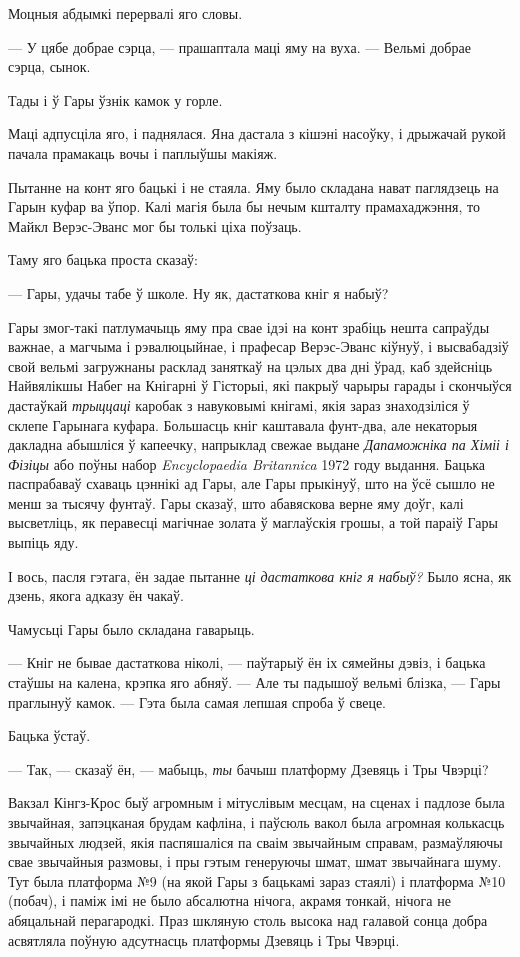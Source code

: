 Моцныя абдымкі перервалі яго словы.

--- У цябе добрае сэрца, --- прашаптала маці яму на вуха. --- Вельмі добрае 
сэрца, сынок.

Тады і ў Гары ўзнік камок у горле.

Маці адпусціла яго, і паднялася. Яна дастала з кішэні насоўку, і 
дрыжачай рукой пачала прамакаць вочы і паплыўшы макіяж.

Пытанне на конт яго бацькі і не стаяла. Яму было складана нават паглядзець
на Гарын куфар ва ўпор. Калі магія была бы нечым кшталту прамахаджэння, то
Майкл Верэс-Эванс мог бы толькі ціха поўзаць.

Таму яго бацька проста сказаў:

--- Гары, удачы табе ў школе. Ну як, дастаткова кніг я набыў?

Гары змог-такі патлумачыць яму пра свае ідэі на конт зрабіць нешта сапраўды 
важнае, а магчыма і рэвалюцыйнае, і прафесар Верэс-Эванс кіўнуў, і высвабадзіў
свой вельмі загружнаны расклад заняткаў на цэлых два дні ўрад, каб здейсніць 
Найвялікшы Набег на Кнігарні ў Гісторыі, які пакрыў чарыры гарады і скончыўся
дастаўкай  \emph{трыццаці} каробак з навуковымі кнігамі, якія зараз знаходзіліся 
ў склепе Гарынага куфара. Большасць кніг каштавала фунт-два, але некаторыя 
дакладна абышліся ў капеечку, напрыклад свежае выдане  
\emph{Дапаможніка па Хіміі і Фізіцы} або поўны набор \emph{Encyclopaedia Britannica}
1972 году выдання. Бацька паспрабаваў схаваць цэннікі ад Гары, але Гары 
прыкінуў, што на ўсё сышло не менш за тысячу фунтаў. Гары сказаў, што 
абавяскова верне яму доўг, калі высветліць, як перавесці магічнае золата ў 
маглаўскія грошы, а той параіў Гары выпіць яду.  

І вось, пасля гэтага, ён задае пытанне \emph{ці дастаткова кніг я набыў?} 
Было ясна, як дзень, якога адказу ён чакаў.

Чамусьці Гары было складана гаварыць.

--- Кніг не бывае дастаткова ніколі, --- паўтарыў ён іх сямейны дэвіз, і бацька
стаўшы на калена, крэпка яго абняў. --- Але ты падышоў вельмі блізка, 
--- Гары праглынуў камок. --- Гэта была самая лепшая спроба ў свеце.

Бацька ўстаў.

--- Так, --- сказаў ён, --- мабыць, \emph{ты} бачыш платформу Дзевяць і Тры Чвэрці?

Вакзал Кінгз-Крос быў агромным і мітуслівым месцам, на сценах і падлозе была
звычайная, запэцканая брудам кафліна, і паўсюль вакол была агромная колькасць
звычайных людзей, якія паспяшаліся па сваім звычайным справам, размаўляючы
свае звычайныя размовы, і пры гэтым генеруючы шмат, шмат звычайнага шуму.
Тут была платформа №9 (на якой Гары з бацькамі зараз стаялі) і платформа
№10 (побач), і паміж імі не было абсалютна нічога, акрамя тонкай, нічога не 
абяцальнай перагародкі. Праз шкляную столь высока над галавой сонца добра
асвятляла поўную адсутнасць платформы Дзевяць і Тры Чвэрці.

